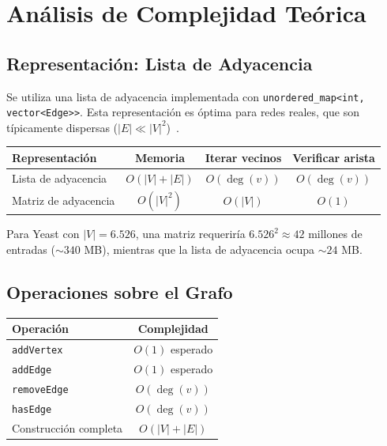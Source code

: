 \section{Análisis de Complejidad Teórica}

\subsection{Representación: Lista de Adyacencia}

Se utiliza una lista de adyacencia implementada con \texttt{unordered\_map<int, vector<Edge>>}.
Esta representación es óptima para redes reales, que son típicamente dispersas ($|E| \ll |V|^2$)~\cite{cormen2009}.

\begin{center}
\begin{tabular}{lccc}
\toprule
\textbf{Representación} & \textbf{Memoria} & \textbf{Iterar vecinos} & \textbf{Verificar arista} \\
\midrule
Lista de adyacencia & $O(|V|+|E|)$ & $O(\deg(v))$ & $O(\deg(v))$ \\
Matriz de adyacencia & $O(|V|^2)$ & $O(|V|)$ & $O(1)$ \\
\bottomrule
\end{tabular}
\end{center}

Para Yeast con $|V| = 6.526$, una matriz requeriría $6.526^2 \approx 42$ millones de
entradas ($\sim 340$ MB), mientras que la lista de adyacencia ocupa $\sim 24$ MB.

\subsection{Operaciones sobre el Grafo}

\begin{center}
\begin{tabular}{lc}
\toprule
\textbf{Operación} & \textbf{Complejidad} \\
\midrule
\texttt{addVertex} & $O(1)$ esperado \\
\texttt{addEdge} & $O(1)$ esperado \\
\texttt{removeEdge} & $O(\deg(v))$ \\
\texttt{hasEdge} & $O(\deg(v))$ \\
Construcción completa & $O(|V|+|E|)$ \\
\bottomrule
\end{tabular}
\end{center}

